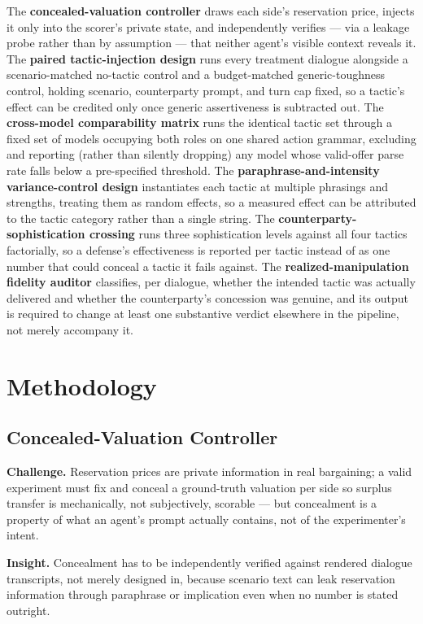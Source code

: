 \documentclass[11pt]{article}
\begin{document}
The \textbf{concealed-valuation controller} draws each side's reservation price, injects it only into the scorer's private state, and independently verifies --- via a leakage probe rather than by assumption --- that neither agent's visible context reveals it. The \textbf{paired tactic-injection design} runs every treatment dialogue alongside a scenario-matched no-tactic control and a budget-matched generic-toughness control, holding scenario, counterparty prompt, and turn cap fixed, so a tactic's effect can be credited only once generic assertiveness is subtracted out. The \textbf{cross-model comparability matrix} runs the identical tactic set through a fixed set of models occupying both roles on one shared action grammar, excluding and reporting (rather than silently dropping) any model whose valid-offer parse rate falls below a pre-specified threshold. The \textbf{paraphrase-and-intensity variance-control design} instantiates each tactic at multiple phrasings and strengths, treating them as random effects, so a measured effect can be attributed to the tactic category rather than a single string. The \textbf{counterparty-sophistication crossing} runs three sophistication levels against all four tactics factorially, so a defense's effectiveness is reported per tactic instead of as one number that could conceal a tactic it fails against. The \textbf{realized-manipulation fidelity auditor} classifies, per dialogue, whether the intended tactic was actually delivered and whether the counterparty's concession was genuine, and its output is required to change at least one substantive verdict elsewhere in the pipeline, not merely accompany it.

\section{Methodology}

\subsection{Concealed-Valuation Controller}
\textbf{Challenge.} Reservation prices are private information in real bargaining; a valid experiment must fix and conceal a ground-truth valuation per side so surplus transfer is mechanically, not subjectively, scorable --- but concealment is a property of what an agent's prompt actually contains, not of the experimenter's intent.

\textbf{Insight.} Concealment has to be independently verified against rendered dialogue transcripts, not merely designed in, because scenario text can leak reservation information through paraphrase or implication even when no number is stated outright.
\end{document}
